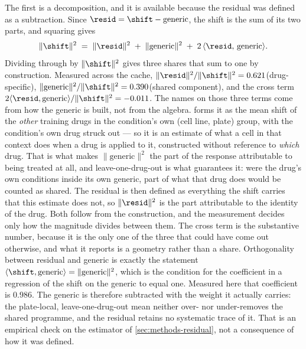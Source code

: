 The first is a decomposition, and it is available because the residual was defined
as a subtraction.  Since $\resid = \shift - \textrm{generic}$, the shift is the sum
of its two parts, and squaring gives
\begin{equation}
 \lVert \shift \rVert^{2}
 \;=\; \lVert \resid \rVert^{2}
 \;+\; \lVert \textrm{generic} \rVert^{2}
 \;+\; 2\,\langle \resid,\, \textrm{generic} \rangle .
\end{equation}
Dividing through by $\lVert \shift \rVert^{2}$ gives three shares that sum to one
by construction. Measured across the cache,
$\lVert \resid \rVert^{2} / \lVert \shift \rVert^{2} = 0.621$(drug-specific),
$\lVert \textrm{generic} \rVert^{2} / \lVert \shift \rVert^{2} = 0.390$(shared component), and the
cross term $2\langle \resid, \textrm{generic}\rangle / \lVert \shift \rVert^{2}
= -0.011$. The names on those three terms come from how the generic is built, not from the
algebra.  forms it as the mean shift of the \emph{other}
training drugs in the condition's own (cell line, plate) group, with the
condition's own drug struck out --- so it is an estimate of what a cell in that
context does when a drug is applied to it, constructed without reference to
\emph{which} drug. That is what makes $\lVert \textrm{generic} \rVert^{2}$ the part
of the response attributable to being treated at all, and leave-one-drug-out is
what guarantees it: were the drug's own conditions inside its own generic, part of
what that drug does would be counted as shared. The residual is then defined as
everything the shift carries that this estimate does not, so
$\lVert \resid \rVert^{2}$ is the part attributable to the identity of the drug. Both follow from the construction, and the measurement
decides only how the magnitude divides between them. 
The cross term is the substantive number, because it is the only one of the three
that could have come out otherwise, and what it reports is a geometry rather than
a share. Orthogonality between residual and generic is exactly the statement
$\langle \shift, \textrm{generic}\rangle = \lVert \textrm{generic} \rVert^{2}$,
which is the condition for the coefficient in a regression of the shift on the
generic to equal one. Measured here that coefficient is $0.986$. The generic is
therefore subtracted with the weight it actually carries: the plate-local,
leave-one-drug-out mean neither over- nor under-removes the shared programme, and
the residual retains no systematic trace of it. That is an empirical check on the
estimator of \cref{sec:methods-residual}, not a consequence of how it was defined.

